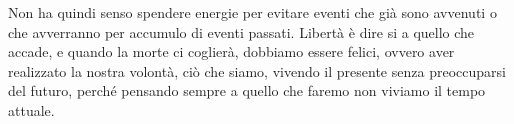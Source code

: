 \documentclass[a4paper,12pt,oneside]{article}%
\begin{document}
Non ha quindi senso spendere energie per evitare eventi che già sono avvenuti o che avverranno per accumulo di eventi passati. Libertà è dire si a quello che accade, e quando la morte ci coglierà, dobbiamo essere felici, ovvero aver realizzato la nostra volontà, ciò che siamo, vivendo il presente senza preoccuparsi del futuro, perché pensando sempre a quello che faremo non viviamo il tempo attuale.
\end{document}
